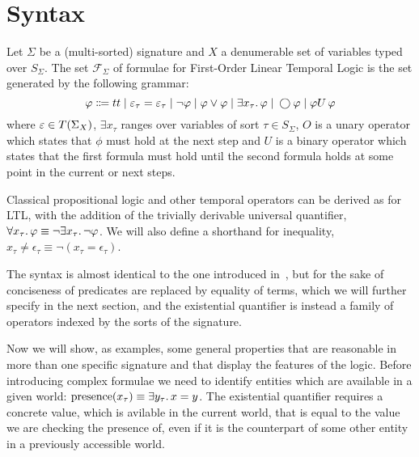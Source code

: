 \section{Syntax}

\begin{definition}
Let $\Sigma$ be a (multi-sorted) signature and $X$ a denumerable set of variables typed over $S_\Sigma$. The set
$\mathcal{F}_\Sigma$ of formulae for First-Order Linear Temporal Logic is the set generated by the following grammar:
\[
  \varphi \Coloneqq tt \;|\; \varepsilon_\tau = \varepsilon_\tau
                    \;|\; \neg\varphi
                    \;|\; \varphi \lor \varphi
                    \;|\; \exists {x_\tau} \ldotp {\varphi}
                    \;|\; \bigcirc{\varphi}
                    \;|\; {\varphi}U\,{\varphi}
\]
where $\varepsilon \in T({\Sigma}_{X})$, $\exists x_\tau$ ranges over variables of sort $\tau \in S_\Sigma$,
$O$ is a unary operator which states that $\phi$ must hold at the next step and $U$ is a binary operator which states
that the first formula must hold until the second formula holds at some point in the current or next steps.
\end{definition}

Classical propositional logic and other temporal operators can be derived as for LTL, with the addition of the trivially
derivable universal quantifier, $\forall {x_\tau} \ldotp {\varphi} \equiv \neg\exists {x_\tau} \ldotp {\neg\varphi}$. We will also define a
shorthand for inequality, $x_\tau \neq \epsilon_\tau \equiv \neg(x_\tau = \epsilon_\tau)$.

The syntax is almost identical to the one introduced in~, but for the sake of conciseness of predicates are replaced by
equality of terms, which we will further specify in the next section, and the existential quantifier is instead a family
of operators indexed by the sorts of the signature.

Now we will show, as examples, some general properties that are reasonable in more than one specific signature and that
display the features of the logic. Before introducing complex formulae we need to identify entities which are available
in a given world: $\text{presence}(x_\tau) \equiv \exists {y_\tau} \ldotp {x = y}$. The existential quantifier requires a
concrete value, which is avilable in the current world, that is equal to the value we are checking the presence of, even
if it is the counterpart of some other entity in a previously accessible world.

